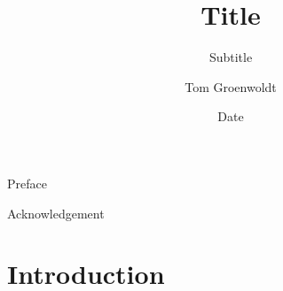 \documentclass{thesis}
\title{Title}
\subtitle{Subtitle}
\author{Tom Groenwoldt}
\date{Date}
\begin{document}
\frontmatter

\maketitle

\tableofcontents


\begin{abstract}
\lipsum[1-2]
\end{abstract}

\begin{preface}{Preface}
\lipsum[3-5]
\end{preface}

\begin{preface}{Acknowledgement}
\lipsum[6]
\end{preface}


\mainmatter


\chapter{Introduction}

\lipsum[7-20]

\backmatter
\printbibliography
\listoffigures
\listoftables

\insertdeclaration
\end{document}
